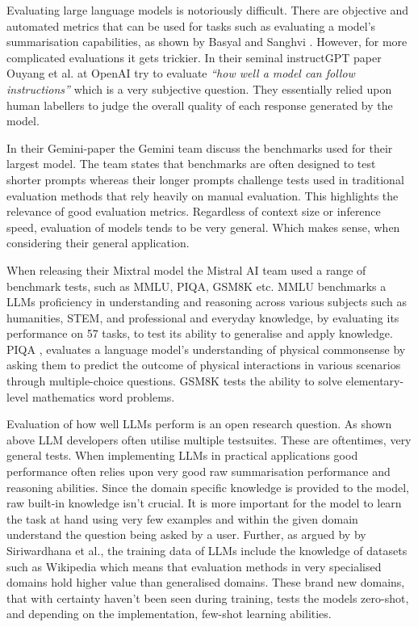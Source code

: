 Evaluating large language models is notoriously difficult. There are objective and automated metrics that can be used for tasks such as evaluating a model's summarisation capabilities, as shown by Basyal and Sanghvi \cite{basyal_text_2023}. However, for more complicated evaluations it gets trickier. In their seminal instructGPT paper Ouyang et al. \cite{ouyang_training_2022-3} at OpenAI try to evaluate \textit{“how well a model can follow instructions”} which is a very subjective question. They essentially relied upon human labellers to judge the overall quality of each response generated by the model.


In their Gemini-paper the Gemini team discuss the benchmarks used for their largest model. The team states that benchmarks are often designed to test shorter prompts whereas their longer prompts challenge tests used in traditional evaluation methods that rely heavily on manual evaluation. This highlights the relevance of good evaluation metrics. Regardless of context size or inference speed, evaluation of models tends to be very general. Which makes sense, when considering their general application.


When releasing their Mixtral model \cite{jiang_mixtral_2024} the Mistral AI team used a range of benchmark tests, such as \gls{MMLU}, \gls{PIQA}, \gls{GSM8K} etc. \gls{MMLU} \cite{hendrycks_measuring_2020} benchmarks a \gls{LLM}s proficiency in understanding and reasoning across various subjects such as humanities, STEM, and professional and everyday knowledge, by evaluating its performance on 57 tasks, to test its ability to generalise and apply knowledge. \gls{PIQA} \cite{bisk_piqa_2020}, evaluates a language model's understanding of physical commonsense by asking them to predict the outcome of physical interactions in various scenarios through multiple-choice questions. \gls{GSM8K} \cite{cobbe_training_2021} tests the ability to solve elementary-level mathematics word problems.


Evaluation of how well \gls{LLM}s perform is an open research question. As shown above \gls{LLM} developers often utilise multiple testsuites. These are oftentimes, very general tests. When implementing \gls{LLM}s in practical applications good performance often relies upon very good raw summarisation performance and reasoning abilities. Since the domain specific knowledge is provided to the model, raw built-in knowledge isn’t crucial. It is more important for the model to learn the task at hand using very few examples and within the given domain understand the question being asked by a user.
Further, as argued by by Siriwardhana et al., the training data of \gls{LLM}s include the knowledge of datasets such as Wikipedia \cite{siriwardhana_improving_2023} which means that evaluation methods in very specialised domains hold higher value than generalised domains. These brand new domains, that with certainty haven't been seen during training, tests the models zero-shot, and depending on the implementation, few-shot learning abilities.


